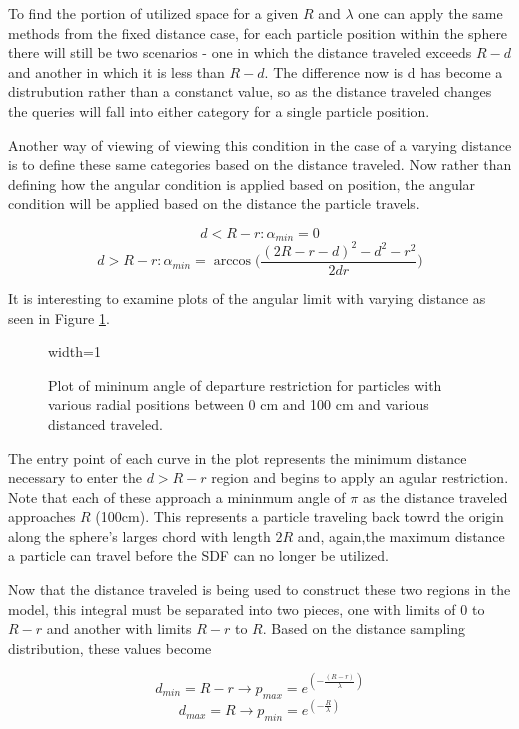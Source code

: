 To find the portion of utilized space for a given $R$ and $\lambda$ one can
apply the same methods from the fixed distance case, for each particle position
within the sphere there will still be two scenarios - one in which the distance
traveled exceeds $R-d$ and another in which it is less than $R-d$. The difference
now is d has become a distrubution rather than a constanct value, so as the
distance traveled changes the queries will fall into either category for a
single particle position.

Another way of viewing of viewing this condition in the case of a varying
distance is to define these same categories based on the distance traveled. Now
rather than defining how the angular condition is applied based on position, the
angular condition will be applied based on the distance the particle travels.

$$ d < R-r : \alpha_{min} = 0 $$
$$ d > R-r : \alpha_{min} = \arccos\Bigg ( \frac{(2R-r-d)^2-d^2-r^2}{2 d r} \Bigg
) $$

It is interesting to examine plots of the angular limit with varying distance as
seen in Figure \ref{fig:alpha_min}.

\begin{figure}[ht]
  \centering
  {width=1\textwidth}
  \caption{Plot of mininum angle of departure restriction for particles with
    various radial positions between 0 cm and 100 cm and various distanced traveled.}
 \label{fig:alpha_min}
\end{figure}

The entry point of each curve in the plot represents the minimum distance
necessary to enter the $d > R-r$ region and begins to apply an agular
restriction. Note that each of these approach a mininmum angle of $\pi$ as the
distance traveled approaches $R$ (100cm). This represents a particle traveling
back towrd the origin along the sphere's larges chord with length $2R$ and,
again,the maximum distance a particle can travel before the SDF can no longer be
utilized.

Now that the distance traveled is being used to construct these two regions in
the model, this integral must be separated into two pieces, one with limits of $0$
to $R-r$ and another with limits $R-r$ to $R$. Based on the distance sampling
distribution, these values become

$$ d_{min} = R-r \rightarrow p_{max} = e^{(-\frac{(R-r)}{\lambda})} $$
$$ d_{max} = R   \rightarrow p_{min} = e^{(-\frac{R}{\lambda})} $$

